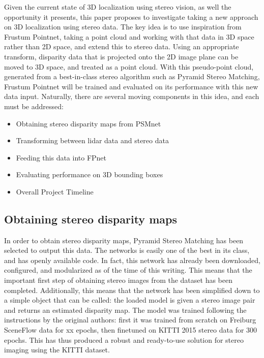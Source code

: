 Given the current state of 3D localization using stereo vision, as well the opportunity it presents, this paper proposes to investigate taking a new approach on 3D localization using stereo data. The key idea is to use inspiration from Frustum Pointnet, taking a point cloud and working with that data in 3D space rather than 2D space, and extend this to stereo data. Using an appropriate transform, disparity data that is projected onto the 2D image plane can be moved to 3D space, and treated as a point cloud. With this pseudo-point cloud, generated from a best-in-class stereo algorithm such as Pyramid Stereo Matching, Frustum Pointnet will be trained and evaluated on its performance with this new data input. 
Naturally, there are several moving components in this idea, and each must be addressed: 
\begin{itemize}\itemsep=-0.5em
    \item Obtaining stereo disparity maps from PSMnet
    \item Transforming between lidar data and stereo data
    \item Feeding this data into FPnet
    \item Evaluating performance on 3D bounding boxes
    \item Overall Project Timeline
\end{itemize}

\subsection{Obtaining stereo disparity maps}
In order to obtain stereo disparity maps, Pyramid Stereo Matching has been selected to output this data. The networks is easily one of the best in its class, and has openly available code. In fact, this network has already been downloaded, configured, and modularized as of the time of this writing. This means that the important first step of obtaining stereo images from the dataset has been completed. Additionally, this means that the network has been simplified down to a simple object that can be called: the loaded model is given a stereo image pair and returns an estimated disparity map. The model was trained following the instructions by the original authors: first it was trained from scratch on Freiburg SceneFlow data for xx epochs, then finetuned on KITTI 2015 stereo data for 300 epochs. This has thus produced a robust and ready-to-use solution for stereo imaging using the KITTI dataset. 

